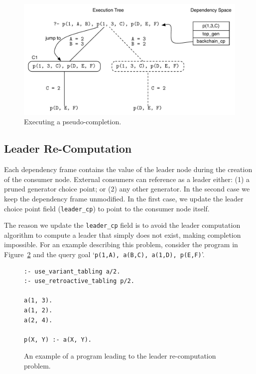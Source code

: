 \begin{figure}[ht]
  \centering
    \includegraphics[scale=0.6]{retro_pseudo_completion2.pdf}
  \caption{Executing a pseudo-completion.}
  \label{fig:retro_pseudo_completion2}
\end{figure}

\subsection{Leader Re-Computation}

Each dependency frame contains the value of the leader node during the creation of the consumer node.
External consumers can reference as a leader either: (1) a pruned generator choice point; or (2) any other generator.
In the second case we keep the dependency frame unmodified. In the first case, we update the leader choice point
field (\texttt{leader\_cp}) to point to the consumer node itself.

The reason we update the \texttt{leader\_cp} field is to avoid the leader computation algorithm to compute
a leader that simply does not exist, making completion impossible.
For an example describing this problem, consider the program in Figure~\ref{fig:retro_leader_program}
and the query goal `\texttt{p(1,A),~a(B,C),~a(1,D),~p(E,F)}'.

\begin{figure}[ht]
\begin{Verbatim}
:- use_variant_tabling a/2.
:- use_retroactive_tabling p/2.

a(1, 3).
a(1, 2).
a(2, 4).

p(X, Y) :- a(X, Y).
\end{Verbatim}
\caption{An example of a program leading to the leader re-computation problem.}
\label{fig:retro_leader_program}
\end{figure}

